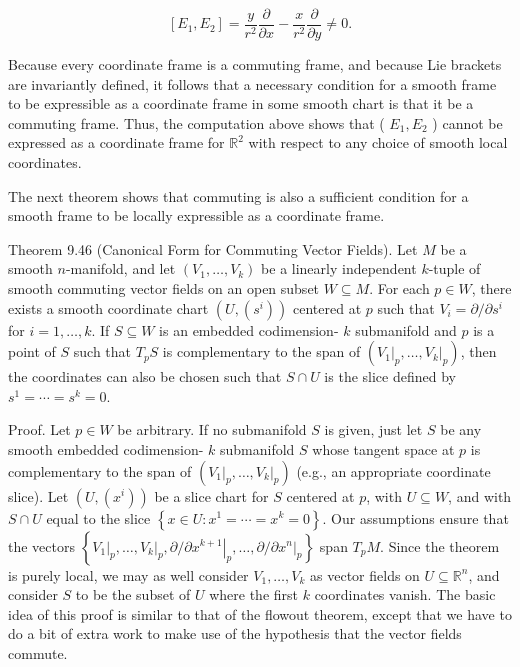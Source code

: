 \documentclass[10pt]{article}
\begin{document}
$$
\left[E_{1}, E_{2}\right]=\frac{y}{r^{2}} \frac{\partial}{\partial x}-\frac{x}{r^{2}} \frac{\partial}{\partial y} \neq 0 .
$$

Because every coordinate frame is a commuting frame, and because Lie brackets are invariantly defined, it follows that a necessary condition for a smooth frame to be expressible as a coordinate frame in some smooth chart is that it be a commuting frame. Thus, the computation above shows that ( $E_{1}, E_{2}$ ) cannot be expressed as a coordinate frame for $\mathbb{R}^{2}$ with respect to any choice of smooth local coordinates.

The next theorem shows that commuting is also a sufficient condition for a smooth frame to be locally expressible as a coordinate frame.

Theorem 9.46 (Canonical Form for Commuting Vector Fields). Let $M$ be a smooth $n$-manifold, and let $\left(V_{1}, \ldots, V_{k}\right)$ be a linearly independent $k$-tuple of smooth commuting vector fields on an open subset $W \subseteq M$. For each $p \in W$, there exists a smooth coordinate chart $\left(U,\left(s^{i}\right)\right)$ centered at $p$ such that $V_{i}=\partial / \partial s^{i}$ for $i=1, \ldots, k$. If $S \subseteq W$ is an embedded codimension- $k$ submanifold and $p$ is a point of $S$ such that $T_{p} S$ is complementary to the span of $\left(\left.V_{1}\right|_{p}, \ldots,\left.V_{k}\right|_{p}\right)$, then the coordinates can also be chosen such that $S \cap U$ is the slice defined by $s^{1}=\cdots=s^{k}=0$.

Proof. Let $p \in W$ be arbitrary. If no submanifold $S$ is given, just let $S$ be any smooth embedded codimension- $k$ submanifold $S$ whose tangent space at $p$ is complementary to the span of $\left(\left.V_{1}\right|_{p}, \ldots,\left.V_{k}\right|_{p}\right)$ (e.g., an appropriate coordinate slice). Let $\left(U,\left(x^{i}\right)\right)$ be a slice chart for $S$ centered at $p$, with $U \subseteq W$, and with $S \cap U$ equal to the slice $\left\{x \in U: x^{1}=\cdots=x^{k}=0\right\}$. Our assumptions ensure that the vectors $\left\{\left.V_{1}\right|_{p}, \ldots,\left.V_{k}\right|_{p}, \partial /\left.\partial x^{k+1}\right|_{p}, \ldots, \partial /\left.\partial x^{n}\right|_{p}\right\}$ span $T_{p} M$. Since the theorem is purely local, we may as well consider $V_{1}, \ldots, V_{k}$ as vector fields on $U \subseteq \mathbb{R}^{n}$, and consider $S$ to be the subset of $U$ where the first $k$ coordinates vanish. The basic idea of this proof is similar to that of the flowout theorem, except that we have to do a bit of extra work to make use of the hypothesis that the vector fields commute.
\end{document}
